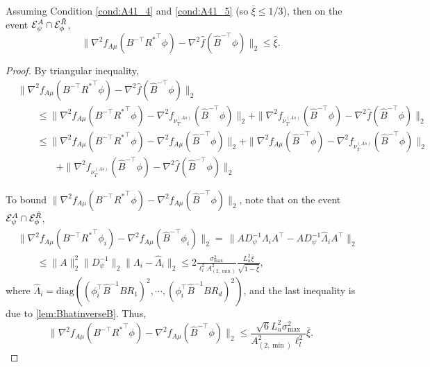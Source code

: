\begin{lemma}
	\label{lem:Binversenablavariation2}
	Assuming Condition \eqref{cond:A41_4} and \eqref{cond:A41_5} (so $\bar{\xi} \le 1/3$), then on the event $\mathcal{E}^A_{\psi}\cap\mathcal{E}^{\tilde{R}}_{\phi}$,
	\[
	\|\nabla^2 f_{A\mu}(B^{-\top}{R^*}^{\top}\phi) - \nabla^2 \widehat{f}(\hat{B}^{-\top}\phi)  \|_2 
	\le
	\hat{\xi}.
	\]
\end{lemma}
\begin{proof}
	By triangular inequality, 
	\begin{align*}
	& \|\nabla^2 f_{A\mu}(B^{-\top}{R^*}^{\top}\phi) - \nabla^2 \hat{f}(\hat{B}^{-\top}\phi)  \|_2 \\
	& \qquad \le 
	\|\nabla^2 f_{A\mu}(B^{-\top}{R^*}^{\top}\phi) - \nabla^2 f_{\nu_T^{(As)}}(\hat{B}^{-\top}\phi)  \|_2  +
	\|\nabla^2 f_{\nu_T^{(As)}}(\hat{B}^{-\top}\phi) - \nabla^2 \widehat{f}(\hat{B}^{-\top}\phi)  \|_2\\
	& \qquad \le \|\nabla^2 f_{A\mu}(B^{-\top}{R^*}^{\top}\phi) - \nabla^2 f_{A\mu}(\hat{B}^{-\top}\phi)\|_2
	+ \|\nabla^2 f_{A\mu}(\hat{B}^{-\top}\phi) - \nabla^2 f_{\nu_T^{(As)}}(\hat{B}^{-\top}\phi)\|_2 \\
	&\qquad \qquad + \|\nabla^2 f_{\nu_T^{(As)}}(\hat{B}^{-\top}\phi) - \nabla^2 \widehat{f}(\hat{B}^{-\top}\phi)  \|_2
	\end{align*}
	
	To bound $\|\nabla^2 f_{A\mu}(B^{-\top}{R^*}^{\top}\phi) - \nabla^2 f_{A\mu}(\hat{B}^{-\top}\phi)\|_2$, note that on the event $\mathcal{E}^A_{\psi}\cap\mathcal{E}^{\tilde{R}}_{\phi}$,
	\begin{align*}
	& \|\nabla^2 f_{A\mu}(B^{-\top}{R^*}^{\top}\phi_i) - \nabla^2 f_{A\mu}(\hat{B}^{-\top}\phi_i)\|_2 =  \, \|A D_{\psi}^{-1}\Lambda_iA^{\top}- A D_{\psi}^{-1}\hat{\Lambda}_iA^{\top}\|_2 \\
	& \qquad \le \|A\|^2_2 \|D_{\psi}^{-1}\|_2 \|\Lambda_i - \hat{\Lambda}_i\|_2 \le 2\frac{\sigma_{\max}^2}{\ell_l^2A^2_{(2,\min)}}\frac{L_u^2\bar{\xi}}{\sqrt{1-\bar{\xi}}},
	\end{align*}
	where $\hat{\Lambda}_i = \text{diag}\left((\phi_i^{\top}\hat{B}^{-1}BR_1)^2, \cdots, (\phi_i^{\top}\hat{B}^{-1}BR_d)^2\right)$, and the last inequality is due to \cref{lem:BhatinverseB}.
	Thus,
	\begin{equation}
	\label{eq:A45eq1}
	\|\nabla^2 f_{A\mu}(B^{-\top}{R^*}^{\top}\phi) - \nabla^2 f_{A\mu}(\hat{B}^{-\top}\phi)\|_2 \le  \frac{\sqrt{6}L_u^2\sigma_{\max}^2}{A^2_{(2,\min)}\ell_l^2}\bar{\xi}. 
	\end{equation}
	

\end{proof}
